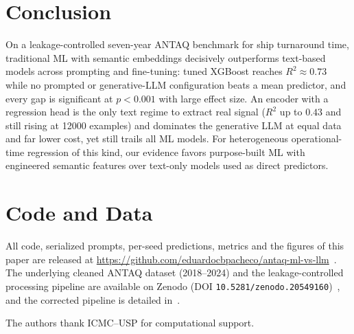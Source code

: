 \documentclass[kdmile,a4paper]{kdmile}
\begin{document}
\section{Conclusion}
On a leakage-controlled seven-year ANTAQ benchmark for ship turnaround time, traditional ML with semantic embeddings decisively outperforms text-based models across prompting and fine-tuning: tuned XGBoost reaches $R^2\approx0.73$ while no prompted or generative-LLM configuration beats a mean predictor, and every gap is significant at $p<0.001$ with large effect size. An encoder with a regression head is the only text regime to extract real signal ($R^2$ up to $0.43$ and still rising at 12000 examples) and dominates the generative LLM at equal data and far lower cost, yet still trails all ML models. For heterogeneous operational-time regression of this kind, our evidence favors purpose-built ML with engineered semantic features over text-only models used as direct predictors.

\section{Code and Data}
All code, serialized prompts, per-seed predictions, metrics and the figures of this paper are released at \url{https://github.com/eduardocbpacheco/antaq-ml-vs-llm}~\cite{repo_code}. The underlying cleaned ANTAQ dataset (2018--2024) and the leakage-controlled processing pipeline are available on Zenodo (DOI \texttt{10.5281/zenodo.20549160})~\cite{zenodo_antaq}, and the corrected pipeline is detailed in~\cite{pacheco2026pitfalls}.

\begin{ack}
The authors thank ICMC--USP for computational support.
\end{ack}




\begin{received}
\end{received}
\end{document}
